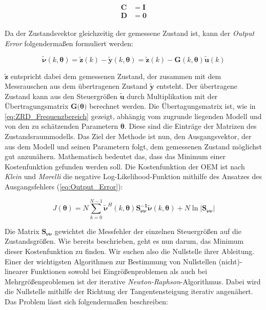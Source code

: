 \begin{align}
	\begin{split}
		\mathbf{C} &= \mathbf{I} \\
		\mathbf{D} &= \mathbf{0}          
		\label{eq:CD}
	\end{split}
\end{align}

Da der Zustandsvektor gleichzeitig der gemessene Zustand ist, kann der \textit{Output Error} folgendermaßen formuliert werden:

\begin{equation}
    \mathbf{\tilde{\nu}}(k,\mathbf{\theta}) = \mathbf{\tilde{z}}(k)-\mathbf{\tilde{y}}(k,\mathbf{\theta}) = \mathbf{\tilde{z}}(k)-\mathbf{G}(k,\mathbf{\theta})\mathbf{\tilde{u}}(k)  
	\label{eq:Output_Error}
\end{equation}

$\mathbf{\tilde{z}}$ entspricht dabei dem gemessenen Zustand, der zusammen mit dem Messrauschen aus dem übertragenen Zustand 
$\mathbf{\tilde{y}}$ entsteht. Der übertragene Zustand kann aus den Steuergrößen $\mathbf{\tilde{u}}$ durch Multiplikation 
mit der Übertragungsmatrix $\mathbf{G}(\mathbf{\theta)}$ berechnet werden. Die Übertagungsmatrix ist, wie in 
\cref{eq:ZRD_Frequenzbereich} gezeigt, abhängig vom zugrunde liegenden Modell und von den zu schätzenden Parametern 
$\mathbf{\theta}$. Diese sind die Einträge der Matrizen des Zustandsraummodells. Das Ziel der Methode ist nun, den 
Ausgangsvektor, der aus dem Modell und seinen Parametern folgt, dem gemessenen Zustand möglichst gut anzunähern. Mathematisch 
bedeutet das, dass das Minimum einer Kostenfunktion gefunden werden soll. Die Kostenfunktion der OEM ist nach \textit{Klein} 
und \textit{Morelli} \cite{Klein2006} die negative Log-Likelihood-Funktion mithilfe des Ansatzes des Ausgangsfehlers 
(\ref{eq:Output_Error}):

\begin{equation}
    J(\mathbf{\theta})=N 
    \sum\limits_{k=0}^{N-1}\mathbf{\tilde{\nu}}^H(k,\mathbf{\theta})\mathbf{S_{\nu\nu}^{-1}}\mathbf{\tilde{\nu}}(k,\mathbf{\theta})+N
     \ln{\left|\mathbf{S_{\nu\nu}}\right|}
	\label{eq:Kostenfunktion}
\end{equation}  

Die Matrix $\mathbf{S_{\nu\nu}}$ gewichtet die Messfehler der einzelnen Steuergrößen auf die Zustandsgrößen. Wie bereits 
beschrieben, geht es nun darum, das Minimum dieser Kostenfunktion zu finden. Wir suchen also die Nullstelle ihrer Ableitung. 
Einer der wichtigsten Algorithmen zur Bestimmung von Nullstellen (nicht)-linearer Funktionen sowohl bei Eingrößenproblemen 
als auch bei Mehrgrößenproblemen ist der iterative \textit{Newton-Raphson}-Algorithmus. Dabei wird die Nullstelle  mithilfe 
der Richtung der Tangentensteigung iterativ angenähert. Das Problem lässt sich folgendermaßen beschreiben:\\

